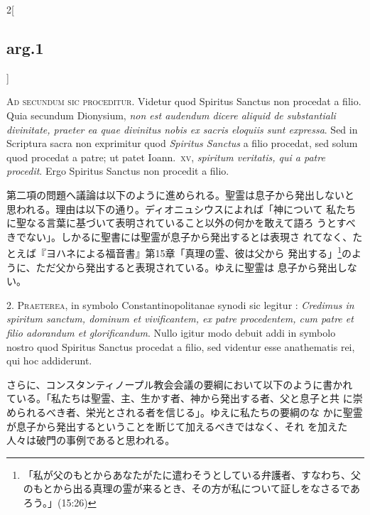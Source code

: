 \documentclass[paper=a4paper,fontsize=10pt,jafontsize=9pt,titlepage]{jlreq}
\begin{document}
\begin{paracol}{2}[\subsection{arg.1}]

{\scshape Ad secundum sic proceditur}. Videtur quod Spiritus Sanctus
non procedat a filio. Quia secundum Dionysium, {\itshape non est audendum dicere
aliquid de substantiali divinitate, praeter ea quae divinitus nobis ex
sacris eloquiis sunt expressa}. Sed in Scriptura sacra non exprimitur
quod {\itshape Spiritus Sanctus} a filio procedat, sed solum quod
procedat a patre; ut patet Ioann.~{\scshape xv}, {\itshape spiritum veritatis, qui a patre
procedit}. Ergo Spiritus Sanctus non procedit a filio.

\switchcolumn

第二項の問題へ議論は以下のように進められる。聖霊は息子から発出しないと
 思われる。理由は以下の通り。ディオニュシウスによれば「神について
 私たちに聖なる言葉に基づいて表明されていること以外の何かを敢えて語ろ
 うとすべきでない」。しかるに聖書には聖霊が息子から発出するとは表現さ
 れてなく、たとえば『ヨハネによる福音書』第15章「真理の霊、彼は父から
 発出する」\footnote{「私が父のもとからあなたがたに遣わそうとしている弁護者、すなわち、父のもとから出る真理の霊が来るとき、その方が私について証しをなさるであろう。」(15:26)}のように、ただ父から発出すると表現されている。ゆえに聖霊は
 息子から発出しない。


2. {\scshape Praeterea}, in symbolo Constantinopolitanae synodi sic
 legitur :
{\itshape Credimus in spiritum sanctum, dominum et vivificantem, ex patre
procedentem, cum patre et filio adorandum et glorificandum}. Nullo
igitur modo debuit addi in symbolo nostro quod Spiritus
Sanctus procedat a filio, sed videntur esse anathematis rei, qui hoc
addiderunt.

\switchcolumn

さらに、コンスタンティノープル教会会議の要綱において以下のように書かれ
 ている。「私たちは聖霊、主、生かす者、神から発出する者、父と息子と共
 に崇められるべき者、栄光とされる者を信じる」。ゆえに私たちの要綱のな
 かに聖霊が息子から発出するということを断じて加えるべきではなく、それ
 を加えた人々は破門の事例であると思われる。



\end{paracol}
\end{document}
